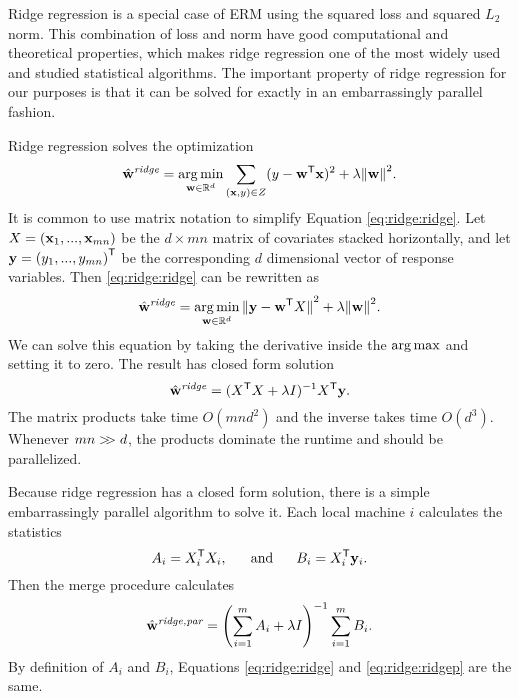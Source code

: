 \documentclass[thesis.tex]{subfiles}
\newcommand{\wridge}{\hat\w^\textit{ridge}}
\newcommand{\wridgep}{\hat\w^\textit{ridge,par}}
\begin{document}

Ridge regression is a special case of ERM using the squared loss and squared $L_2$ norm.
This combination of loss and norm have good computational and theoretical properties,
which makes ridge regression one of the most widely used and studied statistical algorithms.
The important property of ridge regression for our purposes is that it can be solved for exactly in an embarrassingly parallel fashion.

Ridge regression solves the optimization
\begin{equation}
    \label{eq:ridge:ridge}
    \wridge = \argmin_{\w\in\R^d} \sum_{(\x,y)\in Z} (y-\trans \w \x)^2 + \lambda\ltwo{\w}^2
    .
\end{equation}
It is common to use matrix notation to simplify Equation \eqref{eq:ridge:ridge}.
Let $X=(\mathbf{x}_1,...,\mathbf{x}_{mn})$ be the $d\times mn$ matrix of covariates stacked horizontally,
and let $\mathbf{y}=(y_1,...,y_{mn}{)}^{\mathsf{T}}$ be the corresponding $d$ dimensional vector of response variables.
Then \eqref{eq:ridge:ridge} can be rewritten as
\begin{equation}
    \wridge = \argmin_{\w\in\R^d} \ltwo{\y - \trans \w X}^2 + \lambda\ltwo{\w}^2
    .
\end{equation}
We can solve this equation by taking the derivative inside the $\operatorname*{arg\,max}$ and setting it to zero.
The result has closed form solution
\begin{equation}
    \wridge = (\trans X X + \lambda I)^{-1}\trans X\y
    .
\end{equation}
The matrix products take time $O(mnd^2)$ and the inverse takes time $O(d^3)$.
Whenever $mn >\!\!> d$, the products dominate the runtime and should be parallelized.

Because ridge regression has a closed form solution,
there is a simple embarrassingly parallel algorithm to solve it.
Each local machine $i$ calculates the statistics
\begin{equation}
    A_i = {X}^{\mathsf{T}}_i X_i
    ,~~~~~\text{and}~~~~~
    B_i = {X}^{\mathsf{T}}_i \mathbf{y}_i
    .
\end{equation}
Then the merge procedure calculates
\begin{equation}
    \label{eq:ridge:ridgep}
    \wridgep = \left(\sum_{i=1}^m A_i + \lambda I\right)^{-1} \sum_{i=1}^m B_i
    .
\end{equation}
By definition of $A_i$ and $B_i$,
Equations \eqref{eq:ridge:ridge} and \eqref{eq:ridge:ridgep} are the same.
\end{document}
